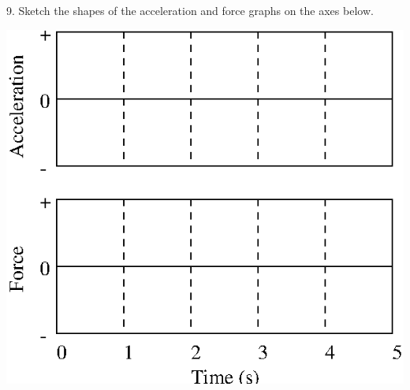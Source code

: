 9. Sketch the shapes of the acceleration and force graphs on the axes below.

\vspace{0.3cm}
{\par\centering \includegraphics{force1/force1_fig9.eps} \par}
\vspace{0.3cm}

